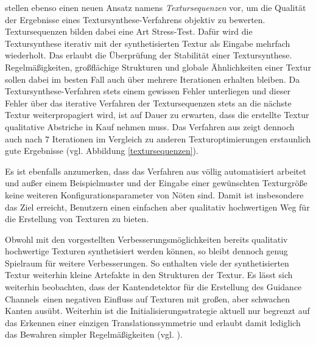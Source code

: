 \cite{SelfTuning} stellen ebenso einen neuen Ansatz namens \emph{Textursequenzen} vor, um die Qualität der Ergebnisse eines Textursynthese-Verfahrens objektiv zu bewerten.
Textursequenzen bilden dabei eine Art \glqq Stress-Test\grqq.
Dafür wird die Textursynthese iterativ mit der synthetisierten Textur als Eingabe mehrfach wiederholt.
Das erlaubt die Überprüfung der Stabilität einer Textursynthese.
Regelmäßigkeiten, großflächige Strukturen und globale Ähnlichkeiten einer Textur sollen dabei im besten Fall auch über mehrere Iterationen erhalten bleiben.
Da Textursynthese-Verfahren stets einem gewissen Fehler unterliegen und dieser Fehler über das iterative Verfahren der Textursequenzen stets an die nächste Textur weiterpropagiert wird, ist auf Dauer zu erwarten, dass die erstellte Textur qualitative Abstriche in Kauf nehmen muss.
Das Verfahren aus \cite{SelfTuning} zeigt dennoch auch nach 7 Iterationen im Vergleich zu anderen Texturoptimierungen erstaunlich gute Ergebnisse (vgl. Abbildung \ref{textursequenzen}).

Es ist ebenfalls anzumerken, dass das Verfahren aus \cite{SelfTuning} völlig automatisiert arbeitet und außer einem Beispielmuster und der Eingabe einer gewünschten Texturgröße keine weiteren Konfigurationsparameter von Nöten sind.
Damit ist insbesondere das Ziel erreicht, Benutzern einen einfachen aber qualitativ hochwertigen Weg für die Erstellung von Texturen zu bieten.

Obwohl mit den vorgestellten Verbesserungsmöglichkeiten bereits qualitativ hochwertige Texturen synthetisiert werden können, so bleibt dennoch genug Spielraum für weitere Verbesserungen.
So enthalten viele der synthetisierten Textur weiterhin kleine Artefakte in den Strukturen der Textur.
Es lässt sich weiterhin beobachten, dass der Kantendetektor für die Erstellung des \glqq Guidance Channels\grqq \ einen negativen Einfluss auf Texturen mit großen, aber schwachen Kanten ausübt.
Weiterhin ist die Initialisierungsstrategie aktuell nur begrenzt auf das Erkennen einer einzigen Translationssymmetrie und erlaubt damit lediglich das Bewahren simpler Regelmäßigkeiten (vgl. \cite{SelfTuning}).

